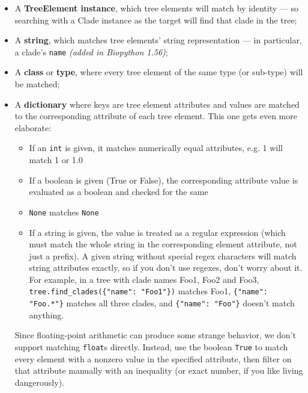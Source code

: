\documentclass{report}
\begin{document}
\begin{itemize}
  \item A \textbf{TreeElement instance}, which tree elements will match by identity --- so
    searching with a Clade instance as the target will find that clade in the tree;

  \item A \textbf{string}, which matches tree elements' string representation --- in
    particular, a clade's \verb|name| \textit{(added in Biopython 1.56)};

  \item A \textbf{class} or \textbf{type}, where every tree element of the same type (or
    sub-type) will be matched;

  \item A \textbf{dictionary} where keys are tree element attributes and values are matched to the
    corresponding attribute of each tree element. This one gets even more elaborate:

    \begin{itemize}
      \item If an \texttt{int} is given, it matches numerically equal attributes, e.g. 1 will
        match 1 or 1.0

      \item If a boolean is given (True or False), the corresponding attribute value is
        evaluated as a boolean and checked for the same

      \item \texttt{None} matches \texttt{None}

      \item If a string is given, the value is treated as a regular expression (which must
        match the whole string in the corresponding element attribute, not just a prefix).  A
        given string without special regex characters will match string attributes exactly, so
        if you don't use regexes, don't worry about it.  For example, in a tree with clade
        names Foo1, Foo2 and Foo3, \verb|tree.find_clades({"name": "Foo1"})| matches Foo1,
        \verb|{"name": "Foo.*"}| matches all three clades, and \verb|{"name": "Foo"}| doesn't
        match anything.

    \end{itemize}

    Since floating-point arithmetic can produce some strange behavior, we don't support
    matching \texttt{float}s directly. Instead, use the boolean \texttt{True} to match every
    element with a nonzero value in the specified attribute, then filter on that attribute
    manually with an inequality (or exact number, if you like living dangerously).


\end{itemize}
\end{document}
